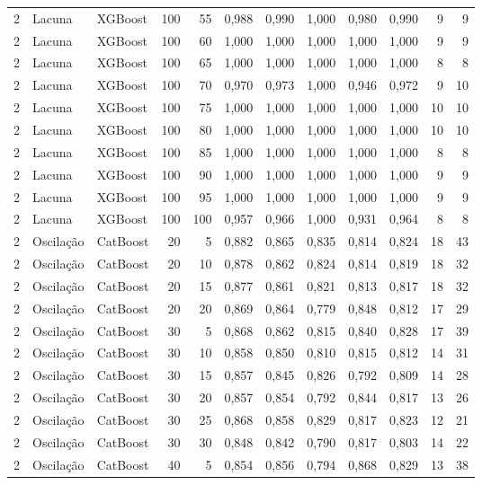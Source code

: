 \begin{longtable}{@{}rllrrrrrrrrr@{}}
2 & Lacuna & XGBoost & 100 & 55 & 0,988 & 0,990 & 1,000 & 0,980 & 0,990 & 9 & 9 \\
2 & Lacuna & XGBoost & 100 & 60 & 1,000 & 1,000 & 1,000 & 1,000 & 1,000 & 9 & 9 \\
2 & Lacuna & XGBoost & 100 & 65 & 1,000 & 1,000 & 1,000 & 1,000 & 1,000 & 8 & 8 \\
2 & Lacuna & XGBoost & 100 & 70 & 0,970 & 0,973 & 1,000 & 0,946 & 0,972 & 9 & 10 \\
2 & Lacuna & XGBoost & 100 & 75 & 1,000 & 1,000 & 1,000 & 1,000 & 1,000 & 10 & 10 \\
2 & Lacuna & XGBoost & 100 & 80 & 1,000 & 1,000 & 1,000 & 1,000 & 1,000 & 10 & 10 \\
2 & Lacuna & XGBoost & 100 & 85 & 1,000 & 1,000 & 1,000 & 1,000 & 1,000 & 8 & 8 \\
2 & Lacuna & XGBoost & 100 & 90 & 1,000 & 1,000 & 1,000 & 1,000 & 1,000 & 9 & 9 \\
2 & Lacuna & XGBoost & 100 & 95 & 1,000 & 1,000 & 1,000 & 1,000 & 1,000 & 9 & 9 \\
2 & Lacuna & XGBoost & 100 & 100 & 0,957 & 0,966 & 1,000 & 0,931 & 0,964 & 8 & 8 \\
2 & Oscilação & CatBoost & 20 & 5 & 0,882 & 0,865 & 0,835 & 0,814 & 0,824 & 18 & 43 \\
2 & Oscilação & CatBoost & 20 & 10 & 0,878 & 0,862 & 0,824 & 0,814 & 0,819 & 18 & 32 \\
2 & Oscilação & CatBoost & 20 & 15 & 0,877 & 0,861 & 0,821 & 0,813 & 0,817 & 18 & 32 \\
2 & Oscilação & CatBoost & 20 & 20 & 0,869 & 0,864 & 0,779 & 0,848 & 0,812 & 17 & 29 \\
2 & Oscilação & CatBoost & 30 & 5 & 0,868 & 0,862 & 0,815 & 0,840 & 0,828 & 17 & 39 \\
2 & Oscilação & CatBoost & 30 & 10 & 0,858 & 0,850 & 0,810 & 0,815 & 0,812 & 14 & 31 \\
2 & Oscilação & CatBoost & 30 & 15 & 0,857 & 0,845 & 0,826 & 0,792 & 0,809 & 14 & 28 \\
2 & Oscilação & CatBoost & 30 & 20 & 0,857 & 0,854 & 0,792 & 0,844 & 0,817 & 13 & 26 \\
2 & Oscilação & CatBoost & 30 & 25 & 0,868 & 0,858 & 0,829 & 0,817 & 0,823 & 12 & 21 \\
2 & Oscilação & CatBoost & 30 & 30 & 0,848 & 0,842 & 0,790 & 0,817 & 0,803 & 14 & 22 \\
2 & Oscilação & CatBoost & 40 & 5 & 0,854 & 0,856 & 0,794 & 0,868 & 0,829 & 13 & 38 \\

\end{longtable}
